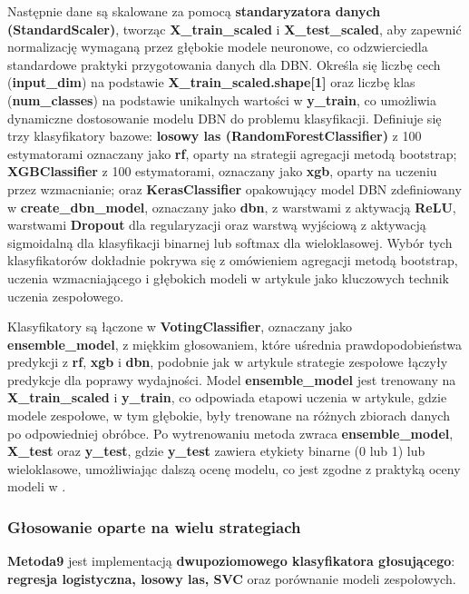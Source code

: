 Następnie dane są skalowane za pomocą \textbf{standaryzatora danych (StandardScaler)}, tworząc \textbf{X\_train\_scaled} i \textbf{X\_test\_scaled}, aby zapewnić normalizację wymaganą przez głębokie modele neuronowe, co odzwierciedla standardowe praktyki przygotowania danych dla DBN. Określa się liczbę cech (\textbf{input\_dim}) na podstawie \textbf{X\_train\_scaled.shape[1]} oraz liczbę klas (\textbf{num\_classes}) na podstawie unikalnych wartości w \textbf{y\_train}, co umożliwia dynamiczne dostosowanie modelu DBN do problemu klasyfikacji. Definiuje się trzy klasyfikatory bazowe: \textbf{losowy las (RandomForestClassifier)} z 100 estymatorami oznaczany jako \textbf{rf}, oparty na strategii agregacji metodą bootstrap; \textbf{XGBClassifier} z 100 estymatorami, oznaczany jako \textbf{xgb}, oparty na uczeniu przez wzmacnianie; oraz \textbf{KerasClassifier} opakowujący model DBN zdefiniowany w \textbf{create\_dbn\_model}, oznaczany jako \textbf{dbn}, z warstwami z aktywacją \textbf{ReLU}, warstwami \textbf{Dropout} dla regularyzacji oraz warstwą wyjściową z aktywacją sigmoidalną dla klasyfikacji binarnej lub softmax dla wieloklasowej. Wybór tych klasyfikatorów dokładnie pokrywa się z omówieniem agregacji metodą bootstrap, uczenia wzmacniającego i głębokich modeli w artykule jako kluczowych technik uczenia zespołowego.

Klasyfikatory są łączone w \textbf{VotingClassifier}, oznaczany jako \textbf{ensemble\_model}, z miękkim głosowaniem, które uśrednia prawdopodobieństwa predykcji z \textbf{rf}, \textbf{xgb} i \textbf{dbn}, podobnie jak w artykule strategie zespołowe łączyły predykcje dla poprawy wydajności. Model \textbf{ensemble\_model} jest trenowany na \textbf{X\_train\_scaled} i \textbf{y\_train}, co odpowiada etapowi uczenia w artykule, gdzie modele zespołowe, w tym głębokie, były trenowane na różnych zbiorach danych po odpowiedniej obróbce. Po wytrenowaniu metoda zwraca \textbf{ensemble\_model}, \textbf{X\_test} oraz \textbf{y\_test}, gdzie \textbf{y\_test} zawiera etykiety binarne (0 lub 1) lub wieloklasowe, umożliwiając dalszą ocenę modelu, co jest zgodne z praktyką oceny modeli w \cite{metoda8}.

\subsubsection{Głosowanie oparte na wielu strategiach}
\textbf{Metoda9} jest implementacją \textbf{dwupoziomowego klasyfikatora głosującego}: \textbf{regresja logistyczna, losowy las, SVC} oraz porównanie modeli zespołowych.

